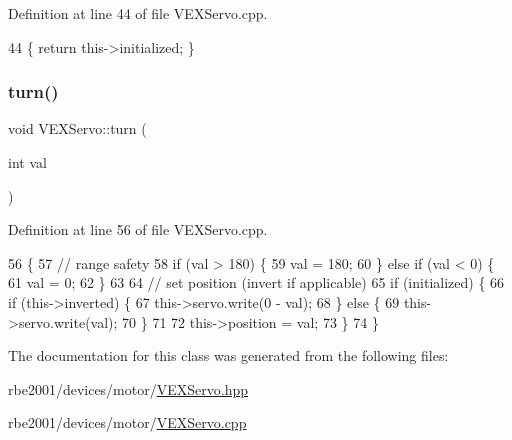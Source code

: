 Definition at line 44 of file V\+E\+X\+Servo.\+cpp.


\begin{DoxyCode}
44 \{ \textcolor{keywordflow}{return} this->initialized; \}
\end{DoxyCode}
\mbox{\label{class_v_e_x_servo_a2de6039ce58da12f9649fe1e04dc8ea9}} 
\subsubsection{\texorpdfstring{turn()}{turn()}}
{\footnotesize\ttfamily void V\+E\+X\+Servo\+::turn (\begin{DoxyParamCaption}\item[{int}]{val }\end{DoxyParamCaption})}



Definition at line 56 of file V\+E\+X\+Servo.\+cpp.


\begin{DoxyCode}
56                            \{
57     \textcolor{comment}{// range safety}
58     \textcolor{keywordflow}{if} (val > 180) \{
59         val = 180;
60     \} \textcolor{keywordflow}{else} \textcolor{keywordflow}{if} (val < 0) \{
61         val = 0;
62     \}
63 
64     \textcolor{comment}{// set position (invert if applicable)}
65     \textcolor{keywordflow}{if} (initialized) \{
66         \textcolor{keywordflow}{if} (this->inverted) \{
67             this->servo.write(0 - val);
68         \} \textcolor{keywordflow}{else} \{
69             this->servo.write(val);
70         \}
71 
72         this->position = val;
73     \}
74 \}
\end{DoxyCode}


The documentation for this class was generated from the following files\+:\begin{DoxyCompactItemize}
\item 
rbe2001/devices/motor/\hyperlink{_v_e_x_servo_8hpp}{V\+E\+X\+Servo.\+hpp}\item 
rbe2001/devices/motor/\hyperlink{_v_e_x_servo_8cpp}{V\+E\+X\+Servo.\+cpp}\end{DoxyCompactItemize}
